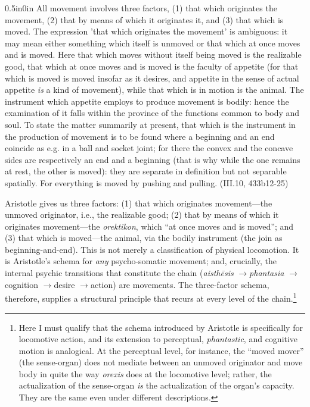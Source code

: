 \documentclass{article}
\newcommand{\ra}{\ensuremath{\rightarrow}}
\begin{document}
\begin{adjustwidth}{0.5in}{0in}
    All movement involves three factors, (1) that which originates the movement, (2) that by means of which it originates it, and (3) that which is moved. The expression 'that which originates the movement' is ambiguous: it may mean either something which itself is unmoved or that which at once moves and is moved. Here that which moves without itself being moved is the realizable good, that which at once moves and is moved is the faculty of appetite (for that which is moved is moved insofar as it desires, and appetite in the sense of actual appetite \textit{is} a kind of movement), while that which is in motion is the animal. The instrument which appetite employs to produce movement is bodily: hence the examination of it falls within the province of the functions common to body and soul. To state the matter summarily at present, that which is the instrument in the production of movement is to be found where a beginning and an end coincide as e.g. in a ball and socket joint; for there the convex and the concave sides are respectively an end and a beginning (that is why while the one remains at rest, the other is moved): they are separate in definition but not separable spatially. For everything is moved by pushing and pulling. (III.10, 433b12-25)
\end{adjustwidth}
Aristotle gives us three factors: (1) that which originates movement---the unmoved originator, i.e., the realizable good; (2) that by means of which it originates movement---the \textit{orektikon}, which ``at once moves and is moved''; and (3) that which is moved---the animal, via the bodily instrument (the join as beginning-and-end). This is not merely a classification of physical locomotion. It is Aristotle's schema for \textit{any} psycho-somatic movement; and, crucially, the internal psychic transitions that constitute the chain (\textit{aisthēsis} \ra \textit{phantasia} \ra cognition \ra desire \ra action) are movements. The three-factor schema, therefore, supplies a structural principle that recurs at every level of the chain.\footnote{Here I must qualify that the schema introduced by Aristotle is specifically for locomotive action, and its extension to perceptual, \textit{phantastic}, and cognitive motion is analogical. At the perceptual level, for instance, the ``moved mover'' (the sense-organ) does not mediate between an unmoved originator and move body in quite the way \textit{orexis} does at the locomotive level; rather, the actualization of the sense-organ \textit{is} the actualization of the organ's capacity. They are the same even under different descriptions.}
\end{document}
